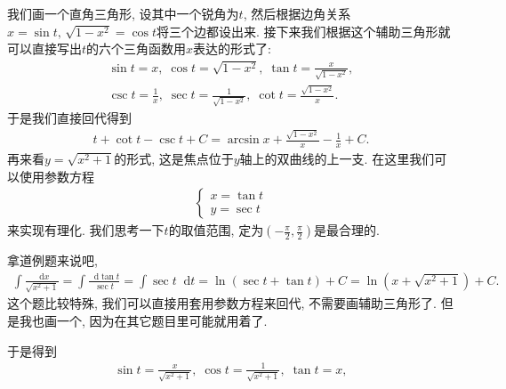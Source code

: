 \documentclass{ctexbook}
\newcommand*{\dif}{\mathop{}\!\mathrm{d}}
\begin{document}
{\begin{center}
\end{center}\par
我们画一个直角三角形, 设其中一个锐角为$t$, 然后根据边角关系$x=\sin{t},\,\sqrt{1-x^{2}}=\cos{t}$将三个边都设出来. 接下来我们根据这个辅助三角形就可以直接写出$t$的六个三角函数用$x$表达的形式了: 
\begin{align*}
\sin{t}=x,\;\cos{t}=\sqrt{1-x^{2}},\;\tan{t}=\frac{x}{\sqrt{1-x^{2}}},\\
\csc{t}=\frac{1}{x},\;\sec{t}=\frac{1}{\sqrt{1-x^{2}}},\;\cot{t}=\frac{\sqrt{1-x^{2}}}{x}
.\end{align*}
于是我们直接回代得到
\begin{align*}
t+\cot{t}-\csc{t}+C=\arcsin{x}+\frac{\sqrt{1-x^{2}}}{x}-\frac{1}{x}+C
.\end{align*}
再来看$y=\sqrt{x^{2}+1}$的形式, 这是焦点位于$y$轴上的双曲线的上一支. 在这里我们可以使用参数方程
\begin{align*}
\begin{cases}
x=\tan{t}\\
y=\sec{t}
\end{cases}
\end{align*}
来实现有理化. 我们思考一下$t$的取值范围, 定为$\left(-\frac{\pi}{2},\frac{\pi}{2}\right)$是最合理的. \par
拿道例题来说吧, 
\begin{align*}
\int\frac{\dif{x}}{\sqrt{x^{2}+1}}=\int\frac{\dif{\tan{t}}}{\sec{t}}=\int\sec{t}\dif{t}=\ln(\sec{t}+\tan{t})+C=\ln(x+\sqrt{x^{2}+1})+C
.\end{align*}
这个题比较特殊, 我们可以直接用套用参数方程来回代, 不需要画辅助三角形了. 但是我也画一个, 因为在其它题目里可能就用着了. 
\begin{center}
\end{center}
于是得到
\begin{align*}
\sin{t}=\frac{x}{\sqrt{x^{2}+1}},\;\cos{t}=\frac{1}{\sqrt{x^{2}+1}},\;\tan{t}=x,\\

\end{align*}}
\end{document}

